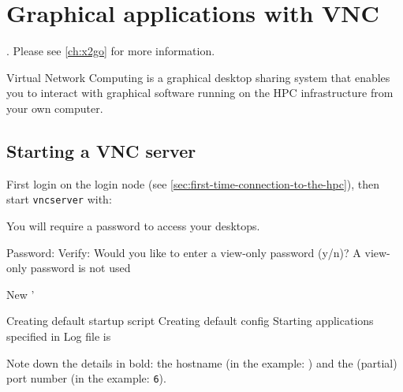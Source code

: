 \chapter{Graphical applications with VNC}
\label{ch:vnc}

\ifgent
{}.
Please see \autoref{ch:x2go} for more information.
\fi

Virtual Network Computing is a graphical desktop sharing system that enables you
to interact with graphical software running on the HPC infrastructure from your own
computer.


\section{Starting a VNC server}
\label{sec:start-vnc}

First login on the login node (see \autoref{sec:first-time-connection-to-the-hpc}),
then start \lstinline|vncserver| with:

\begin{prompt}
You will require a password to access your desktops.

Password:%
Verify:%
Would you like to enter a view-only password (y/n)? %
A view-only password is not used

New '%

Creating default startup script %
Creating default config %
Starting applications specified in %
Log file is %

\end{prompt}


Note down the details in bold: the hostname (in the example: \texttt{\loginhost{}})
and the (partial) port number (in the example: \lstinline|6|).


